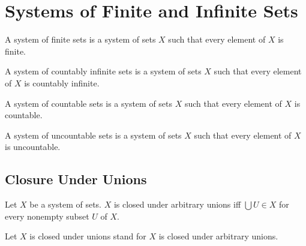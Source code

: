 \documentclass[10pt]{article}
\begin{document}
  \section{Systems of Finite and Infinite Sets}

  \begin{forthel}
    \begin{definition}
      A system of finite sets is a system of sets $X$ such that every element of
      $X$ is finite.
    \end{definition}
  \end{forthel}

  \begin{forthel}
    \begin{definition}
      A system of countably infinite sets is a system of sets $X$ such that
      every element of $X$ is countably infinite.
    \end{definition}
  \end{forthel}

  \begin{forthel}
    \begin{definition}
      A system of countable sets is a system of sets $X$ such that every element
      of $X$ is countable.
    \end{definition}
  \end{forthel}

  \begin{forthel}
    \begin{definition}
      A system of uncountable sets is a system of sets $X$ such that every
      element of $X$ is uncountable.
    \end{definition}
  \end{forthel}


  \subsection{Closure Under Unions}

  \begin{forthel}
    \begin{definition}
      Let $X$ be a system of sets.
      $X$ is closed under arbitrary unions iff $\bigcup U \in X$ for every
      nonempty subset $U$ of $X$.
    \end{definition}

    Let $X$ is closed under unions stand for $X$ is closed under arbitrary
    unions.
  \end{forthel}
\end{document}

